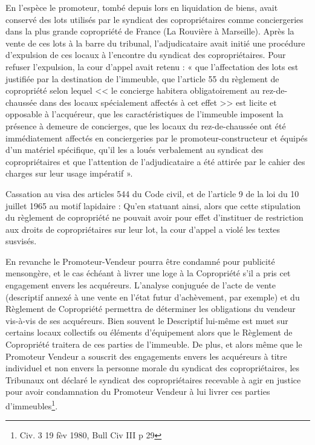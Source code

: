 		En l’espèce le promoteur, tombé depuis lors en liquidation de biens, avait conservé des lots utilisés
		par le syndicat des copropriétaires comme conciergeries dans la plus grande copropriété de France
		(La Rouvière à Marseille). Après la vente de ces lots à la barre du tribunal, l’adjudicataire avait initié
		une procédure d’expulsion de ces locaux à l’encontre du syndicat des copropriétaires. Pour refuser
		l’expulsion, la cour d’appel avait retenu : « que l’affectation des lots est justifiée par la destination
		de l’immeuble, que l’article 55 du règlement de copropriété selon lequel << le concierge habitera
		obligatoirement au rez-de-chaussée dans des locaux spécialement affectés à cet effet >> est licite et
		opposable à l’acquéreur, que les caractéristiques de l’immeuble imposent la présence à demeure de
		concierges, que les locaux du rez-de-chaussée ont été immédiatement affectés en conciergeries par
		le promoteur-constructeur et équipés d’un matériel spécifique, qu’il les a loués verbalement au
		syndicat des copropriétaires et que l’attention de l’adjudicataire a été attirée par le cahier des
		charges sur leur usage impératif ».
		
		Cassation au visa des articles 544 du Code civil, et de l’article 9 de la loi du 10 juillet 1965 au motif
		lapidaire : Qu’en statuant ainsi, alors que cette stipulation du règlement de copropriété ne pouvait
		avoir pour effet d'instituer de restriction aux droits de copropriétaires sur leur lot, la cour d'appel a
		violé les textes susvisés.
		
		En revanche le Promoteur-Vendeur pourra être condamné pour publicité mensongère, et le cas échéant à
		livrer une loge à la Copropriété s’il a pris cet engagement envers les acquéreurs.
		L'analyse conjuguée de l'acte de vente (descriptif annexé à une vente en l'état futur d'achèvement, par
		exemple) et du Règlement de Copropriété permettra de déterminer les obligations du vendeur vis-à-vis
		de ses acquéreurs. Bien souvent le Descriptif lui-même est muet sur certains locaux collectifs ou éléments
		d'équipement alors que le Règlement de Copropriété traitera de ces parties de l'immeuble.
		De plus, et alors même que le Promoteur Vendeur a souscrit des engagements envers les acquéreurs à
		titre individuel et non envers la personne morale du syndicat des copropriétaires, les Tribunaux ont déclaré
		le syndicat des copropriétaires recevable à agir en justice pour avoir condamnation du Promoteur Vendeur
		à lui livrer ces parties d'immeubles\footnote{Civ. 3\degre{} 19 fèv 1980, Bull Civ III  p 29}.
		
